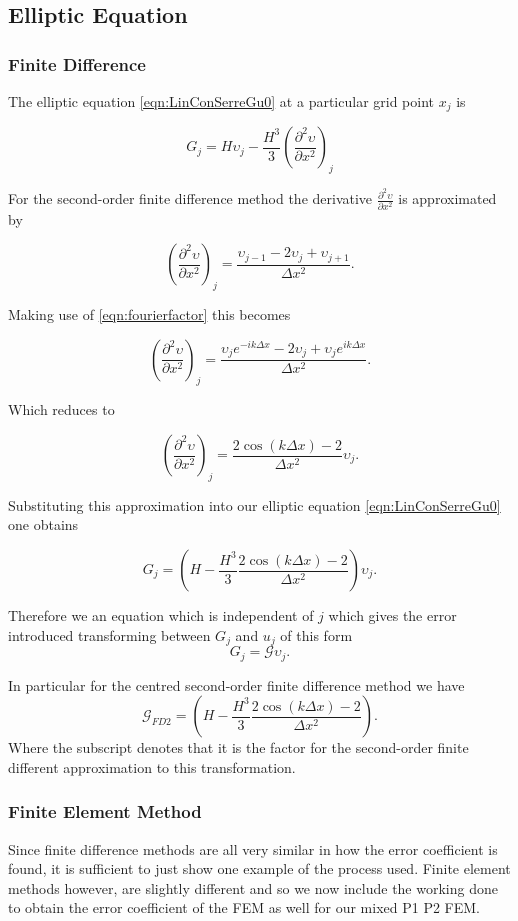 \subsection{Elliptic Equation}

\subsubsection{Finite Difference}
The elliptic equation \eqref{eqn:LinConSerreGu0} at a particular grid point $x_j$ is

\[G_j = H\upsilon_j -\frac{H^3}{3} \left(\frac{\partial^2 \upsilon}{\partial x^2}\right)_j\]

For the second-order finite difference method the derivative $\frac{\partial^2 \upsilon}{\partial x^2}$ is approximated by   

\[ \left(\frac{\partial^2 \upsilon}{\partial x^2}\right)_j = \frac{\upsilon_{j-1} - 2\upsilon_{j} + \upsilon_{j+1}}{\Delta x^2}.\]

Making use of \eqref{eqn:fourierfactor} this becomes

\[ \left(\frac{\partial^2 \upsilon}{\partial x^2}\right)_j = \frac{\upsilon_{j} e^{-ik\Delta x} - 2\upsilon_{j} + \upsilon_{j}e^{ik\Delta x}}{\Delta x^2}.\]

Which reduces to

\[ \left(\frac{\partial^2 \upsilon}{\partial x^2}\right)_j = \frac{ 2\cos\left(k\Delta x\right) - 2 }{\Delta x^2} \upsilon_{j}.\]

Substituting this approximation into our elliptic equation \eqref{eqn:LinConSerreGu0} one obtains

\[G_j = \left(H -\frac{H^3}{3} \frac{ 2\cos\left(k\Delta x\right) - 2 }{\Delta x^2}\right) \upsilon_{j}.\] 

Therefore we an equation which is independent of $j$ which gives the error introduced transforming between $G_j$ and $u_j$ of this form
\[G_j = \mathcal{G} \upsilon_{j}.\]

In particular for the centred second-order finite difference method we have
\[\mathcal{G}_{FD2} = \left(H -\frac{H^3}{3} \frac{ 2\cos\left(k\Delta x\right) - 2 }{\Delta x^2}\right).\]
Where the subscript denotes that it is the factor for the second-order finite different approximation to this transformation.

\subsubsection{Finite Element Method} 
Since finite difference methods are all very similar in how the error coefficient is found, it is sufficient to just show one example of the process used. Finite element methods however, are slightly different and so we now include the working done to obtain the error coefficient of the FEM as well for our mixed P1 P2 FEM. 

